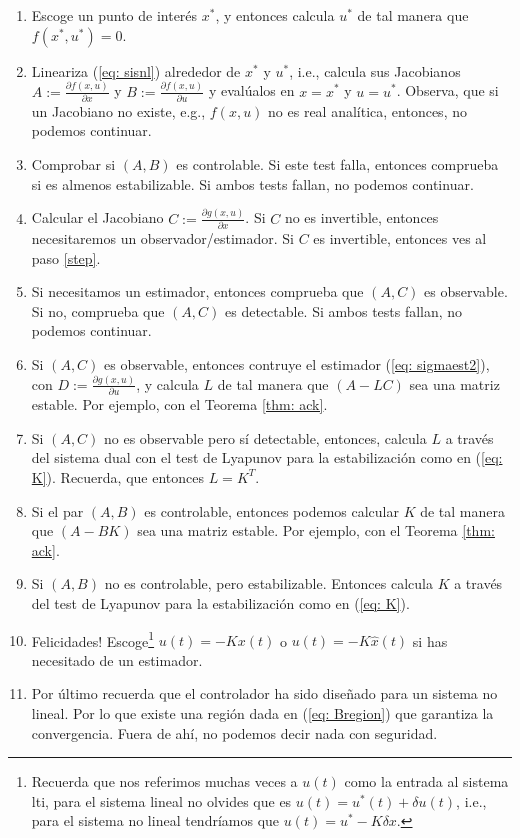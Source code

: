 \begin{enumerate}
	\item Escoge un punto de interés $x^*$, y entonces calcula $u^*$ de tal manera que  $f(x^*,u^*) = 0$.
	\item Lineariza (\ref{eq: sisnl}) alrededor de  $x^*$ y $u^*$, i.e., calcula sus Jacobianos $A:=\frac{\partial f(x,u)}{\partial x}$ y $B:=\frac{\partial f(x,u)}{\partial u}$ y evalúalos en $x=x^*$ y $u=u^*$. Observa, que si un Jacobiano no existe, e.g., $f(x,u)$ no es real analítica, entonces, no podemos continuar.
	\item Comprobar si $(A,B)$ es controlable. Si este test falla, entonces comprueba si es almenos estabilizable. Si ambos tests fallan, no podemos continuar.
	\item Calcular el Jacobiano $C:=\frac{\partial g(x,u)}{\partial x}$. Si $C$ no es invertible, entonces necesitaremos un observador/estimador. Si $C$ es invertible, entonces ves al paso \ref{step}.
	\item Si necesitamos un estimador, entonces comprueba que $(A,C)$ es observable. Si no, comprueba que $(A,C)$ es detectable. Si ambos tests fallan, no podemos continuar.
	\item Si $(A,C)$ es observable, entonces contruye el estimador (\ref{eq: sigmaest2}), con $D:=\frac{\partial g(x,u)}{\partial u}$, y calcula $L$ de tal manera que $(A-LC)$ sea una matriz estable. Por ejemplo, con el Teorema \ref{thm: ack}.
	\item Si $(A,C)$ no es observable pero sí detectable, entonces, calcula $L$ a través del sistema dual con el test de Lyapunov para la estabilización como en (\ref{eq: K}). Recuerda, que entonces $L = K^T$.
	\item \label{step} Si el par $(A,B)$ es controlable, entonces podemos calcular $K$ de tal manera que $(A-BK)$ sea una matriz estable. Por ejemplo, con el Teorema \ref{thm: ack}.
	\item Si $(A,B)$ no es controlable, pero estabilizable. Entonces calcula $K$ a través del test de Lyapunov para la estabilización como en (\ref{eq: K}).
	\item Felicidades! Escoge\footnote{Recuerda que nos referimos muchas veces a $u(t)$ como la entrada al sistema lti, para el sistema lineal no olvides que es $u(t) = u^*(t) + \delta u(t)$, i.e., para el sistema no lineal tendríamos que $u(t) = u^* -K\delta x$.}  $u(t) = -Kx(t)$ o $u(t) = -K\hat x(t)$ si has necesitado de un estimador.
	\item Por último recuerda que el controlador ha sido diseñado para un sistema no lineal. Por lo que existe una región dada en (\ref{eq: Bregion}) que garantiza la convergencia. Fuera de ahí, no podemos decir nada con seguridad.
\end{enumerate}

